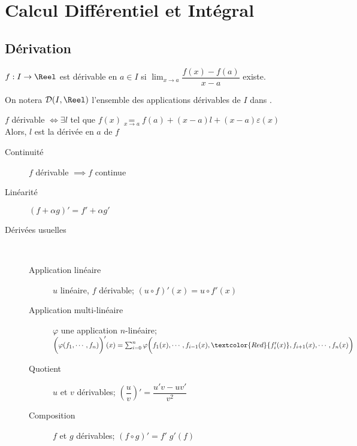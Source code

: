 \documentclass[11pt,a4paper,fleqn,pdftex]{report}
\begin{document}
\chapter{Calcul Différentiel et Intégral}
\section{Dérivation}
\begin{dfn}
$f : I \to \Reel$ est dérivable en $a \in I$ si $\lim_{x\to a} \dfrac{f(x) - f(a)}{x - a}$ existe.
\end{dfn}
On notera $\mathcal{D}(I,\Reel )$ l'ensemble des applications dérivables de $I$ dans \Reel{}.

\begin{theorem}
$f$ dérivable $\Leftrightarrow \exists l$ tel que $f(x) \underset{x\to a}{=} f(a) + (x-a)l + (x-a)\varepsilon (x)$\\
Alors, $l$ est la dérivée en $a$ de $f$
\end{theorem}

\begin{prop}
\begin{description}
    \item[Continuité] $f$ dérivable $\implies f$ continue
    \item[Linéarité] $\left( f + \alpha g \right)' = f' + \alpha g'$
    \item[Dérivées usuelles] \hfill \\[-0.5cm]
        \begin{description}
            \item[Application linéaire] $u$ linéaire, $f$ dérivable; $\left( u \circ f \right)'(x) = u\circ f'(x)$
            \item[Application multi-linéaire] $\varphi$ une application $n$-linéaire;\\ 
            $\bigg( \varphi (f_1, \cdots, f_n) \bigg)'(x) = \sum_{i=0}^n \varphi \bigg( f_1(x), \cdots, f_{i-1}(x), \textcolor{Red}{f_i'(x)},f_{i+1}(x), \cdots , f_n(x) \bigg)$
            \item[Quotient] $u$ et $v$ dérivables; $\left( \dfrac{u}{v} \right)' = \dfrac{u'v - uv'}{v^2}$
            \item[Composition] $f$ et $g$ dérivables; $\left( f \circ g \right)' = f'\; g'(f)$
        \end{description}
\end{description}
\end{prop}
\end{document}
